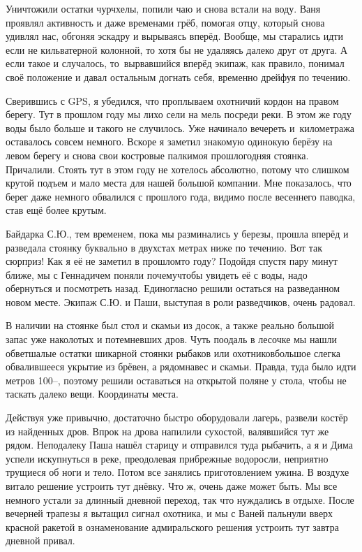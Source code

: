 Уничтожили остатки чурчхелы, попили чаю и снова встали на воду. Ваня проявлял активность и даже временами грёб, помогая отцу, который снова удивлял нас, обгоняя эскадру и вырываясь вперёд. Вообще, мы старались идти если не кильватерной колонной, то хотя бы не удаляясь далеко друг от друга. А если такое и случалось, то~вырвавшийся вперёд экипаж, как правило, понимал своё положение и давал остальным догнать себя, временно дрейфуя по течению.

Сверившись с GPS, я убедился, что проплываем охотничий кордон на правом берегу. Тут в прошлом году мы лихо сели на мель посреди реки. В этом же году воды было больше и такого не случилось. Уже начинало вечереть и~километража оставалось совсем немного. Вскоре я заметил знакомую одинокую берёзу на левом берегу и снова свои костровые палки\mdash моя прошлогодняя стоянка. Причалили. Стоять тут в этом году не хотелось абсолютно, потому что слишком крутой подъем и мало места для нашей большой компании. Мне показалось, что берег даже немного обвалился с прошлого года, видимо после весеннего паводка, став ещё более крутым.

Байдарка С.Ю., тем временем, пока мы разминались у березы, прошла вперёд и разведала стоянку буквально в двухстах метрах ниже по течению. Вот так сюрприз! Как я её не заметил в прошлом\sdash то году? Подойдя спустя пару минут ближе, мы с Геннадичем поняли почему\mdash чтобы увидеть её с воды, надо обернуться и посмотреть назад. Единогласно решили остаться на разведанном новом месте. Экипаж С.Ю. и Паши, выступая в роли разведчиков, очень радовал. 

В наличии на стоянке был стол и скамьи из досок, а также реально большой запас уже наколотых и потемневших дров. Чуть поодаль в лесочке мы нашли обветшалые остатки шикарной стоянки рыбаков или охотников\mdash  большое слегка обвалившееся укрытие из брёвен, а рядом\mdash  навес и скамьи. Правда, туда было идти метров 100\thinspace\nobreakdash--, поэтому решили оставаться на открытой поляне у стола, чтобы не таскать далеко вещи. Координаты места\mdash \CoordsChagodoschaSixteenNearKaban. 

Действуя уже привычно, достаточно быстро оборудовали лагерь, развели костёр из найденных дров. Впрок на дрова напилили сухостой, валявшийся тут же рядом. Неподалеку Паша нашёл старицу и отправился туда рыбачить, а я и Дима успели искупнуться в реке, преодолевая прибрежные водоросли, неприятно трущиеся об ноги и тело. Потом все занялись приготовлением ужина. В воздухе витало решение устроить тут днёвку. Что ж, очень даже может быть. Мы все немного устали за длинный дневной переход, так что нуждались в отдыхе. После вечерней трапезы я вытащил сигнал охотника, и мы с Ваней пальнули вверх красной ракетой в ознаменование адмиральского решения устроить тут завтра дневной привал.

